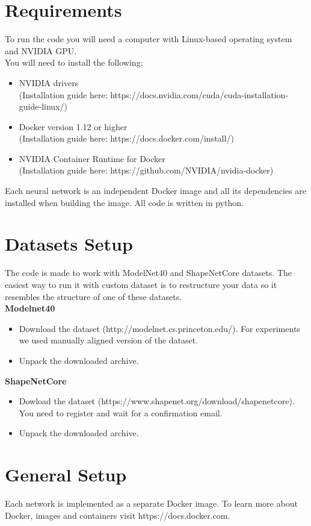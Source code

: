 \section{Requirements}
To run the code you will need a computer with Linux-based operating system and NVIDIA GPU. \\

You will need to install the following:
\begin{itemize}
	\item NVIDIA drivers \\(Installation guide here: https://docs.nvidia.com/cuda/cuda-installation-guide-linux/)
	\item Docker version 1.12 or higher \\(Installation guide here: https://docs.docker.com/install/)
	\item NVIDIA Container Runtime for Docker \\(Installation guide here: https://github.com/NVIDIA/nvidia-docker)
\end{itemize}
Each neural network is an independent Docker image and all its dependencies are installed when building the image. All code is written in python.  

\section{Datasets Setup}
The code is made to work with ModelNet40 and ShapeNetCore datasets. The easiest way to run it with custom dataset is to restructure your data so it resembles the structure of one of these datasets.\\
\textbf{Modelnet40}
\begin{itemize}
	\item {Download the dataset (http://modelnet.cs.princeton.edu/). For experiments we used manually aligned version of the dataset.}
	\item{Unpack the downloaded archive.}
\end{itemize}
\textbf{ShapeNetCore}
\begin{itemize}
		\item {Dowload the dataset (https://www.shapenet.org/download/shapenetcore). You need to register and wait for a confirmation email.}
	\item{Unpack the downloaded archive.}
\end{itemize}

\section{General Setup}
Each network is implemented as a separate Docker image. To learn more about Docker, images and containers visit https://docs.docker.com.


